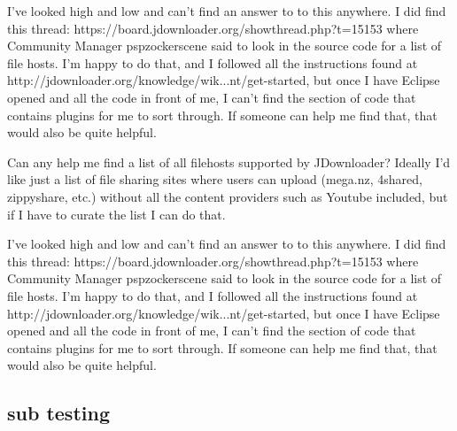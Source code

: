 \documentclass[
]{article}
\begin{document}
I've looked high and low and can't find an answer to to this anywhere. I did find this thread: https://board.jdownloader.org/showthread.php?t=15153 where Community Manager pspzockerscene said to look in the source code for a list of file hosts. I'm happy to do that, and I followed all the instructions found at http://jdownloader.org/knowledge/wik...nt/get-started, but once I have Eclipse opened and all the code in front of me, I can't find the section of code that contains plugins for me to sort through. If someone can help me find that, that would also be quite helpful.

Can any help me find a list of all filehosts supported by JDownloader? Ideally I'd like just a list of file sharing sites where users can upload (mega.nz, 4shared, zippyshare, etc.) without all the content providers such as Youtube included, but if I have to curate the list I can do that.

I've looked high and low and can't find an answer to to this anywhere. I did find this thread: https://board.jdownloader.org/showthread.php?t=15153 where Community Manager pspzockerscene said to look in the source code for a list of file hosts. I'm happy to do that, and I followed all the instructions found at http://jdownloader.org/knowledge/wik...nt/get-started, but once I have Eclipse opened and all the code in front of me, I can't find the section of code that contains plugins for me to sort through. If someone can help me find that, that would also be quite helpful.

\hypertarget{testing subsection}{%
\subsection{sub testing}\label{subsection}}
\end{document}
